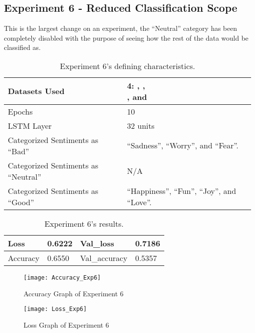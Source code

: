 \subsection{Experiment 6 - Reduced Classification Scope}
\label{exp6}
This is the largest change on an experiment, the ``Neutral'' category has been completely disabled with the purpose of seeing how the rest of the data would be classified as.
\begin{table}[!h]
	\caption{Experiment 6's defining characteristics.}
	\vspace{0.5cm}
	\centering
	\begin{tabular}[t]{|l|l|}
	\hline
		Datasets Used & \makecell{4: \citet{d1}, \citet{d2},\\ \citet{d3}, and \citet{d4}}
	\\ \hline
		Epochs & 10
	\\ \hline
		LSTM Layer & 32 units
	\\ \hline
		Categorized Sentiments as ``Bad'' & ``Sadness'', ``Worry'', and ``Fear''.
	\\ \hline	
		 Categorized Sentiments as ``Neutral'' & N/A
	\\ \hline	
		Categorized Sentiments as ``Good'' & ``Happiness'', ``Fun'', ``Joy'', and ``Love''.
	\\ \hline
	\end{tabular}
\end{table}

\begin{table}[!b]
	\caption{Experiment 6's results.}
	\vspace{0.5cm}
	\centering
	\begin{tabular}[t]{|l|l|l|l|}
	\hline
		Loss & 0.6222 & Val\_loss & 0.7186
	\\ \hline
		Accuracy & 0.6550 & Val\_accuracy & 0.5357
	\\ \hline
	\end{tabular}
\end{table}


\begin{figure}[!h]
	\centering
	\texttt{[image: Accuracy\_Exp6]}
	\caption{Accuracy Graph of Experiment 6}
	\label{fig:accuracy_exp6}
	\texttt{[image: Loss\_Exp6]}
	\caption{Loss Graph of Experiment 6}
	\label{fig:loss_exp6}
\end{figure}
\pagebreak

